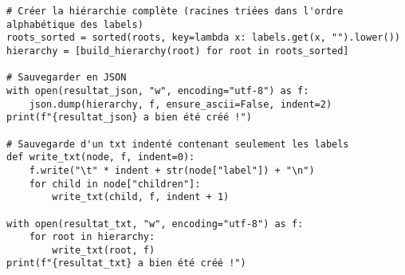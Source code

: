\begin{verbatim}
# Créer la hiérarchie complète (racines triées dans l'ordre alphabétique des labels)
roots_sorted = sorted(roots, key=lambda x: labels.get(x, "").lower())
hierarchy = [build_hierarchy(root) for root in roots_sorted]

# Sauvegarder en JSON
with open(resultat_json, "w", encoding="utf-8") as f:
    json.dump(hierarchy, f, ensure_ascii=False, indent=2)
print(f"{resultat_json} a bien été créé !")

# Sauvegarde d'un txt indenté contenant seulement les labels
def write_txt(node, f, indent=0):
    f.write("\t" * indent + str(node["label"]) + "\n")
    for child in node["children"]:
        write_txt(child, f, indent + 1)

with open(resultat_txt, "w", encoding="utf-8") as f:
    for root in hierarchy:
        write_txt(root, f)
print(f"{resultat_txt} a bien été créé !")
\end{verbatim}